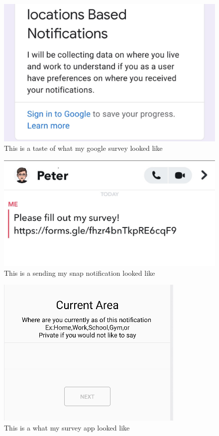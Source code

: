\documentclass{vgtc}                          %
\begin{document}
\begin{figure}
 \includegraphics[width=\columnwidth]{Survey1.jpg}
 \caption{This is a taste of what my google survey looked like}
 \label{fig:sample}
\end{figure}

\begin{figure}
 \includegraphics[width=\columnwidth]{Snap.jpg}
 \caption{This is a sending my snap notification looked like}
 \label{fig:sample}
\end{figure}

\begin{figure}
 \includegraphics[width=\columnwidth]{OldApp.png}
 \caption{This is a what my survey app looked like}
 \label{fig:sample}
\end{figure}
\end{document}
